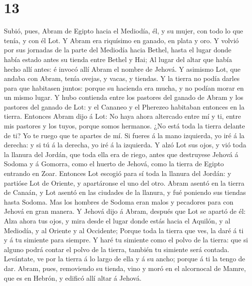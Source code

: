 \hypertarget{section-12}{%
\section{13}\label{section-12}}

 Subió, pues, Abram de Egipto hacia el Mediodía, él, y su
mujer, con todo lo que tenía, y con él Lot.  Y Abram era
riquísimo en ganado, en plata y oro.  Y volvió por sus
jornadas de la parte del Mediodía hacia Bethel, hasta el lugar donde
había estado antes su tienda entre Bethel y Hai;  Al lugar
del altar que había hecho allí antes: é invocó allí Abram el nombre de
Jehová.  Y asimismo Lot, que andaba con Abram, tenía ovejas,
y vacas, y tiendas.  Y la tierra no podía darles para que
habitasen juntos: porque su hacienda era mucha, y no podían morar en un
mismo lugar.  Y hubo contienda entre los pastores del ganado
de Abram y los pastores del ganado de Lot: y el Cananeo y el Pherezeo
habitaban entonces en la tierra.  Entonces Abram dijo á Lot:
No haya ahora altercado entre mí y ti, entre mis pastores y los tuyos,
porque somos hermanos.  ¿No está toda la tierra delante de
ti? Yo te ruego que te apartes de mí. Si fueres á la mano izquierda, yo
iré á la derecha: y si tú á la derecha, yo iré á la izquierda.
 Y alzó Lot sus ojos, y vió toda la llanura del Jordán, que
toda ella era de riego, antes que destruyese Jehová á Sodoma y á
Gomorra, como el huerto de Jehová, como la tierra de Egipto entrando en
Zoar.  Entonces Lot escogió para sí toda la llanura del
Jordán: y partióse Lot de Oriente, y apartáronse el uno del otro.
 Abram asentó en la tierra de Canaán, y Lot asentó en las
ciudades de la llanura, y fué poniendo sus tiendas hasta Sodoma.
 Mas los hombres de Sodoma eran malos y pecadores para con
Jehová en gran manera.  Y Jehová dijo á Abram, después que
Lot se apartó de él: Alza ahora tus ojos, y mira desde el lugar donde
estás hacia el Aquilón, y al Mediodía, y al Oriente y al Occidente;
 Porque toda la tierra que ves, la daré á ti y á tu
simiente para siempre.  Y haré tu simiente como el polvo de
la tierra: que si alguno podrá contar el polvo de la tierra, también tu
simiente será contada.  Levántate, ve por la tierra á lo
largo de ella y á su ancho; porque á ti la tengo de dar. 
Abram, pues, removiendo su tienda, vino y moró en el alcornocal de
Mamre, que es en Hebrón, y edificó allí altar á Jehová.

